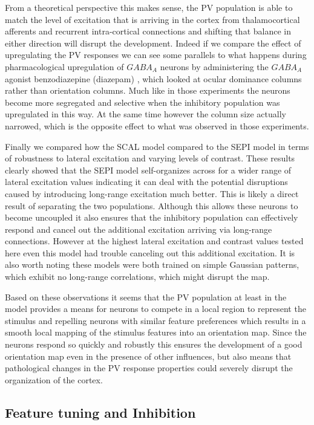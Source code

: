 From a theoretical perspective this makes sense, the PV population is
able to match the level of excitation that is arriving in the cortex
from thalamocortical afferents and recurrent intra-cortical
connections and shifting that balance in either direction will disrupt
the development. Indeed if we compare the effect of upregulating the
PV responses we can see some parallels to what happens during
pharmacological upregulation of $GABA_A$ neurons by administering the
$GABA_A$ agonist benzodiazepine (diazepam)
\citep{Fagiolini2004,Hensch2004}, which looked at ocular dominance
columns rather than orientation columns. Much like in those
experiments the neurons become more segregated and selective when the
inhibitory population was upregulated in this way. At the same time
however the column size actually narrowed, which is the opposite
effect to what was observed in those experiments.

Finally we compared how the SCAL model compared to the SEPI model in
terms of robustness to lateral excitation and varying levels of
contrast. These results clearly showed that the SEPI model
self-organizes across for a wider range of lateral excitation values
indicating it can deal with the potential disruptions caused by
introducing long-range excitation much better. This is likely a direct
result of separating the two populations. Although this allows these
neurons to become uncoupled it also ensures that the inhibitory
population can effectively respond and cancel out the additional
excitation arriving via long-range connections. However at the highest
lateral excitation and contrast values tested here even this model had
trouble canceling out this additional excitation. It is also worth
noting these models were both trained on simple Gaussian patterns,
which exhibit no long-range correlations, which might disrupt the map.

Based on these observations it seems that the PV population at least
in the model provides a means for neurons to compete in a local region
to represent the stimulus and repelling neurons with similar feature
preferences which results in a smooth local mapping of the stimulus
features into an orientation map. Since the neurons respond so quickly
and robustly this ensures the development of a good orientation map
even in the presence of other influences, but also means that
pathological changes in the PV response properties could severely
disrupt the organization of the cortex.

\subsection{Feature tuning and Inhibition}

